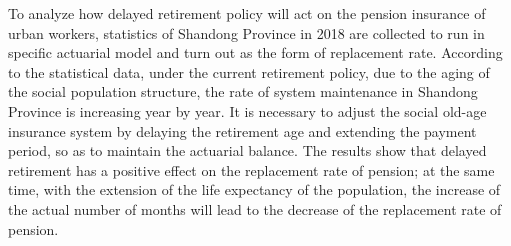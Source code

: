 To analyze how delayed retirement policy will act on the pension insurance of urban workers, statistics of Shandong Province in 2018 are collected to run in specific actuarial model and turn out as the form of replacement rate. According to the statistical data, under the current retirement policy, due to the aging of the social population structure, the rate of system maintenance in Shandong Province is increasing year by year. It is necessary to adjust the social old-age insurance system by delaying the retirement age and extending the payment period, so as to maintain the actuarial balance. The results show that delayed retirement has a positive effect on the replacement rate of pension; at the same time, with the extension of the life expectancy of the population, the increase of the actual number of months will lead to the decrease of the replacement rate of pension.